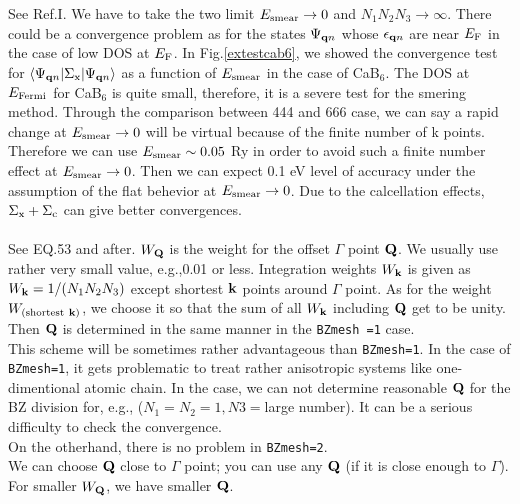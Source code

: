 \documentclass[a4paper,10pt,epsf,fleqn]{article}
\newcommand{\bfk}{{\bf k}}
\newcommand{\bfQ}{{\bf Q}}
\begin{document}
See Ref.I. We have to take the two limit $E_{\rm smear} \to 0$ and
$N_1N_2N_3\to \infty$.
There could be a convergence problem as for
the states $\Psi_{{\bf q}n}$ whose $\epsilon_{{\bf q} n}$
are near $E_{\rm F}$ in the case of low DOS at $E_{\rm F}$.
In Fig.\ref{extestcab6}, we showed the convergence test
for $\langle \Psi_{{\bf q}n}|\Sigma_{\rm x} |\Psi_{{\bf q}n} \rangle$
as a function of $E_{\rm smear}$ in the case of CaB$_6$.
The DOS at $E_{\rm Fermi}$ for CaB$_6$ is quite small, therefore,
it is a severe test for the smering method.
Through the comparison between 444 and 666 case, 
we can say a rapid change at $E_{\rm smear}\to 0$ will be
virtual because of the finite number of k points.
Therefore we can use $E_{\rm smear} \sim 0.05$ Ry
in order to avoid such a finite number effect at $E_{\rm smear}\to 0$.
Then we can expect 0.1 eV level of accuracy under the assumption of the flat
behevior at $E_{\rm smear}\to 0$.
Due to the calcellation effects, $\Sigma_{\rm x} + \Sigma_{\rm c}$ can
give better convergences.\\

\\
See EQ.53 and after. $W_\bfQ$ is the weight for the offset $\Gamma$ point $\bfQ$.
We usually use rather very small value, e.g.,0.01 or less.
Integration weights $W_\bfk$ is given as $W_\bfk= 1/(N_1 N_2 N_3)$
except shortest $\bfk$ points around $\Gamma$ point.
As for the weight $W_{({\rm shortest} \ \bfk)}$, we choose it
so that the sum of all $W_\bfk$ including $\bfQ$ get to be unity.
Then $\bfQ$ is determined in the same manner in
the {\tt BZmesh =1} case.\\

This scheme will be sometimes rather advantageous than {\tt BZmesh=1}.
In the case of {\tt BZmesh=1}, it gets problematic 
to treat rather anisotropic systems like one-dimentional atomic chain.
In the case, we can not determine reasonable $\bfQ$ for the BZ division
for, e.g., ($N_1=N_2=1,N3=$large number). It can be a serious difficulty 
to check the convergence.\\
On the otherhand, there is no problem in {\tt BZmesh=2}. \\
We can choose $\bfQ$ close to $\Gamma$ point; you can use any $\bfQ$
(if it is close enough to $\Gamma$).
For smaller $W_\bfQ$, we have smaller $\bfQ$.\\
\end{document}
